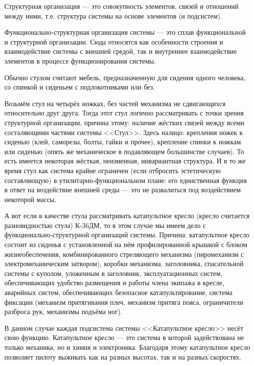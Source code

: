 \documentclass[10pt]{article}
\begin{document}
\begin{enumerate}
  Структурная организация --- это совокупность элементов, связей и отношений между ними, т.е. структура системы на основе элементов (и подсистем).

  Функционально-структурная организация системы --- это сплав функциональной и структурной организации. Сюда относятся как особенности строения и взаимодействие системы с внешней средой, так и внутреннее взаимодействие элементов в процессе функционирования системы.

  Обычно стулом считают мебель, предназначенную для сидения одного человека, со спинкой и сиденьем с подлокотниками или без.

  Возьмём стул на четырёх ножках, без частей механизма не сдвигающихся относительно друг друга. Тогда этот стул логично рассматривать с точки зрения структурной организации, причина этому: наличие жёстких связей между всеми состаляющими частями системы <<Стул>>. Здесь налицо: крепления ножек к сиденью (клей, саморезы, болты, гайки и прочее), крепление спинки к ножкам или сиденью (опять же механическое в подавляющем большинстве случаев). То есть имеется некоторая жёсткая, неизменная, инвариантная структура. И в то же время стул как система крайне ограничен (если отбросить эстетическую составляющую) в утилитарно-функциональном плане: его единственная функция в ответ на воздействие внешней среды --- это не развалиться под воздействием некоторой массы.

  А вот если в качестве стула рассматривать катапультное кресло (кресло считается разновидностью стула) К-36ДМ, то в этом случае мы имеем дело с функционально-структурной организаций системы. Причина: катапультное кресло состоит из сиденья с установленной на нём профилированной крышкой с блоком жизнеобеспечения, комбинированного стреляющего механизма (пиромеханизм с электромеханическим затвором), коробки механизма, заголовника, спасательной системы с куполом, уложенным в заголовник, эксплуатационных систем, обеспечивающих удобство размещения и работы члена экипажа в кресле, аварийных систем, обеспечивающих безопасное катапультирование, система фиксации (механизм притягивания плеч, механизм притяга пояса, ограничители разброса рук, механизмы подъёма ног).

  В данном случае каждая подсистема системы <<Катапультное кресло>> несёт свою функцию. Катапультное кресло --- это система в которой задействована не только механика, но и химия и электроника. Благодаря этому катапультное кресло позволяет пилоту выживать как на разных высотах, так и на разных скоростях.


\end{enumerate}
\end{document}
